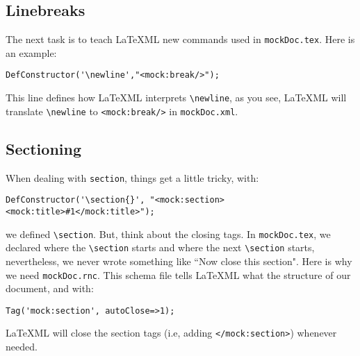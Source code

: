 \documentclass[a4paper]{article}
\def\latexml{{\LaTeX}ML\xspace}
\begin{document}
\subsection{Linebreaks}
The next task is to teach \latexml new commands used in \lstinline|mockDoc.tex|. Here is
an example:
\begin{lstlisting}
DefConstructor('\newline',"<mock:break/>");
\end{lstlisting}

This line defines how \latexml interprets \lstinline|\newline|, as you see,
\latexml will translate \lstinline|\newline| to \lstinline|<mock:break/>| in
\lstinline|mockDoc.xml|.

\subsection{Sectioning}
 When dealing with \lstinline|section|, things get a little tricky, with:
\begin{lstlisting}
DefConstructor('\section{}', "<mock:section><mock:title>#1</mock:title>");
\end{lstlisting}
we defined \lstinline|\section|. But, think about the closing tags. In \lstinline|mockDoc.tex|, we declared where the \lstinline|\section| starts and where the next \lstinline|\section| starts, nevertheless, we never wrote something like ``Now close this section". Here is why we need \lstinline|mockDoc.rnc|. This schema file tells \latexml what the structure of our document, and with:
\begin{lstlisting}
Tag('mock:section', autoClose=>1);
\end{lstlisting}
\latexml will close the section tags (i.e, adding \lstinline|</mock:section>|) whenever needed.
\end{document}
